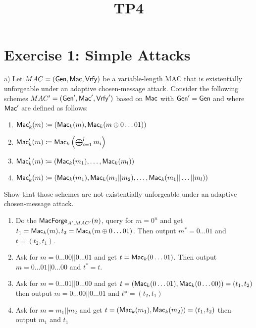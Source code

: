 \documentclass[12pt]{article}
\title{TP4}
\begin{document}
\maketitle
\tableofcontents
\newpage

\section{Exercise 1: Simple Attacks}
a) Let $MAC = (\operatorname{\mathsf{Gen}}, \operatorname{\mathsf{Mac}}, \operatorname{\mathsf{Vrfy}})$ be a variable-length MAC that is existentially unforgeable under an adaptive chosen-message attack. Consider the following schemes $MAC' = (\operatorname{\mathsf{Gen}}', \operatorname{\mathsf{Mac}}', \operatorname{\mathsf{Vrfy}}') $ based on $\operatorname{\mathsf{Mac}}$ with $\operatorname{\mathsf{Gen}}'=\operatorname{\mathsf{Gen}}$ and where $\operatorname{\mathsf{Mac}}'$ are defined as follows:
\begin{enumerate}
	\item $\operatorname{\mathsf{Mac}}'_k(m) \coloneqq (\operatorname{\mathsf{Mac}}_k(m), \operatorname{\mathsf{Mac}}_k(m\oplus 0\dots01))$
	\item $\operatorname{\mathsf{Mac}}'_k(m) \coloneqq \operatorname{\mathsf{Mac}}_k\left(\bigoplus_{i=1}^l m_i \right)$
	\item $\operatorname{\mathsf{Mac}}'_k(m) \coloneqq (\operatorname{\mathsf{Mac}}_k(m_1), \dots, \operatorname{\mathsf{Mac}}_k(m_l))$
	\item $\operatorname{\mathsf{Mac}}'_k(m) \coloneqq (\operatorname{\mathsf{Mac}}_k(m_1), \operatorname{\mathsf{Mac}}_k(m_1||m_2), \dots, \operatorname{\mathsf{Mac}}_k(m_1||\dots||m_l))$
\end{enumerate}
Show that those schemes are not existentially unforgeable under an adaptive chosen-message attack.
\begin{enumerate}
\item Do the $\mathsf{MacForge}_{A',MAC'}(n)$, query for $m=0^n$ and get $t_1=\operatorname{\mathsf{Mac}}_k(m), t_2=\operatorname{\mathsf{Mac}}_k(m\oplus 0\dots01)$. Then output $m^*=0\dots01$ and $t=(t_2,t_1)$.
\item Ask for $m=0\dots00||0\dots01$ and get $t=\operatorname{\mathsf{Mac}}_k(0\dots01)$. Then output $m=0\dots01||0\dots00$ and $t^*=t$.
\item Ask for $m=0\dots01||0\dots00$ and get $t=(\operatorname{\mathsf{Mac}}_k(0\dots01),\operatorname{\mathsf{Mac}}_k(0\dots00))=(t_1,t_2)$ then output $m=0\dots00||0\dots01$ and $t*=(t_2,t_1)$
\item Ask for $m=m_1||m_2$ and get $t=(\operatorname{\mathsf{Mac}}_k(m_1),\operatorname{\mathsf{Mac}}_k(m_2))=(t_1,t_2)$ then output $m_1$ and $t_1$

\end{enumerate}
\end{document}
